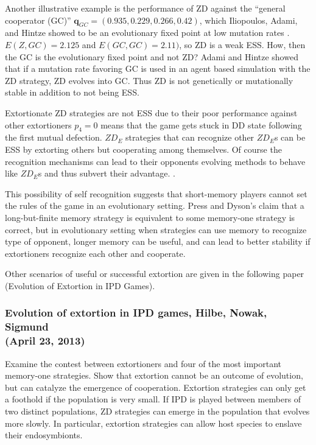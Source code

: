 Another illustrative example is the performance of ZD against the ``general cooperator (GC)'' $\mathbf{q}_{GC} = (0.935, 0.229, 0.266, 0.42)$, which Iliopoulos, Adami, and Hintze showed to be an evolutionary fixed point at low mutation rates \cite{iliopoulos_2010}. $E(Z, GC) = 2.125$ and $E(GC, GC) = 2.11)$, so ZD is a weak ESS. How, then the GC is the evolutionary fixed point and not ZD? Adami and Hintze showed that if a mutation rate favoring GC is used in an agent based simulation with the ZD strategy, ZD evolves into GC. Thus ZD is not genetically or mutationally stable in addition to not being ESS.

Extortionate ZD strategies are not ESS due to their poor performance against other extortioners $p_4 = 0$ means that the game gets stuck in DD state following the first mutual defection. $ZD_E$ strategies that can recognize other $ZD_E$s can be ESS by extorting others but cooperating among themselves. Of course the recognition mechanisms can lead to their opponents evolving methods to behave like $ZD_E$s and thus subvert their advantage. .

This possibility of self recognition suggests that short-memory players cannot set the rules of the game in an evolutionary setting. Press and Dyson's claim that a long-but-finite memory strategy is equivalent to some memory-one strategy is correct, but in evolutionary setting when strategies can use memory to recognize type of opponent, longer memory can be useful, and can lead to better stability if extortioners recognize each other and cooperate.

Other scenarios of useful or successful extortion are given in the following paper (Evolution of Extortion in IPD Games).

\subsubsection{Evolution of extortion in IPD games, Hilbe, Nowak, Sigmund \cite{Hilbe23042013}
\\(April 23, 2013)}
Examine the contest between extortioners and four of the most important memory-one strategies. Show that extortion cannot be an outcome of evolution, but can catalyze the emergence of cooperation. Extortion strategies can only get a foothold if the population is very small. If IPD is played between members of two distinct populations, ZD strategies can emerge in the population that evolves more slowly. In particular, extortion strategies can allow host species to enslave their endosymbionts.

